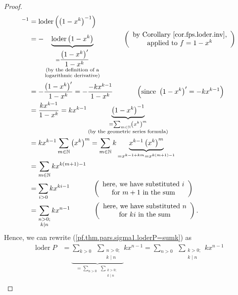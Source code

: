 \begin{proof}
\begin{align*}
{^{-1}}  &  =\operatorname*{loder}\left(  \left(  1-x^{k}\right)  ^{-1}\right)
\\
&  =-\underbrace{\operatorname*{loder}\left(  1-x^{k}\right)  }%
_{\substack{=\dfrac{\left(  1-x^{k}\right)  ^{\prime}}{1-x^{k}}\\\text{(by the
definition of a}\\\text{logarithmic derivative)}}}\ \ \ \ \ \ \ \ \ \ \left(
\begin{array}
[c]{c}%
\text{by Corollary \ref{cor.fps.loder.inv},}\\
\text{applied to }f=1-x^{k}%
\end{array}
\right) \\
&  =-\dfrac{\left(  1-x^{k}\right)  ^{\prime}}{1-x^{k}}=-\dfrac{-kx^{k-1}%
}{1-x^{k}}\ \ \ \ \ \ \ \ \ \ \left(  \text{since }\left(  1-x^{k}\right)
^{\prime}=-kx^{k-1}\right) \\
&  =\dfrac{kx^{k-1}}{1-x^{k}}=kx^{k-1}\underbrace{\left(  1-x^{k}\right)
^{-1}}_{\substack{=\sum_{m\in\mathbb{N}}\left(  x^{k}\right)  ^{m}\\\text{(by
the geometric series formula)}}}\\
&  =kx^{k-1}\sum_{m\in\mathbb{N}}\left(  x^{k}\right)  ^{m}=\sum
_{m\in\mathbb{N}}k\underbrace{x^{k-1}\left(  x^{k}\right)  ^{m}}%
_{=x^{k-1+km}=x^{k\left(  m+1\right)  -1}}\\
&  =\sum_{m\in\mathbb{N}}kx^{k\left(  m+1\right)  -1}\\
&  =\sum_{i>0}kx^{ki-1}\ \ \ \ \ \ \ \ \ \ \left(
\begin{array}
[c]{c}%
\text{here, we have substituted }i\\
\text{for }m+1\text{ in the sum}%
\end{array}
\right) \\
&  =\sum_{\substack{n>0;\\k\mid n}}kx^{n-1}\ \ \ \ \ \ \ \ \ \ \left(
\begin{array}
[c]{c}%
\text{here, we have substituted }n\\
\text{for }ki\text{ in the sum}%
\end{array}
\right)  .
\end{align*}
Hence, we can rewrite (\ref{pf.thm.pars.sigma1.loderP=sumk}) as%
\begin{align*}
\operatorname*{loder}P  &  =\underbrace{\sum_{k>0}\ \ \sum
_{\substack{n>0;\\k\mid n}}}_{=\sum_{n>0}\ \ \sum_{\substack{k>0;\\k\mid n}%
}}kx^{n-1}=\sum_{n>0}\ \ \sum_{\substack{k>0;\\k\mid n}}kx^{n-1}\\

\end{align*}
\end{proof}
